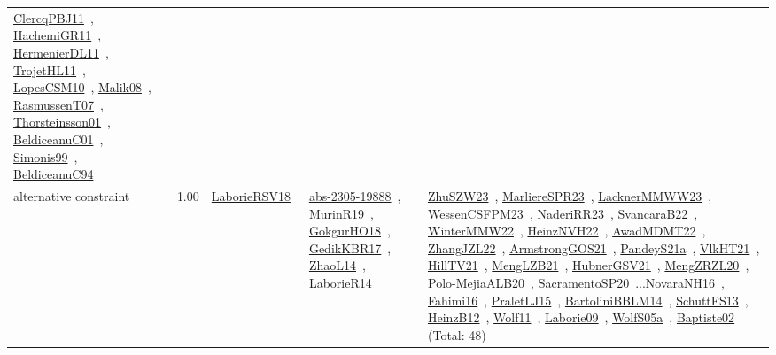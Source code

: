 {\begin{longtable}{p{3cm}r>{\raggedright\arraybackslash}p{6cm}>{\raggedright\arraybackslash}p{6cm}>{\raggedright\arraybackslash}p{8cm}}
\href{../works/ClercqPBJ11.pdf}{ClercqPBJ11}~\cite{ClercqPBJ11}, \href{../works/HachemiGR11.pdf}{HachemiGR11}~\cite{HachemiGR11}, \href{../works/HermenierDL11.pdf}{HermenierDL11}~\cite{HermenierDL11}, \href{../works/TrojetHL11.pdf}{TrojetHL11}~\cite{TrojetHL11}, \href{../works/LopesCSM10.pdf}{LopesCSM10}~\cite{LopesCSM10}, \href{../works/Malik08.pdf}{Malik08}~\cite{Malik08}, \href{../works/RasmussenT07.pdf}{RasmussenT07}~\cite{RasmussenT07}, \href{../works/Thorsteinsson01.pdf}{Thorsteinsson01}~\cite{Thorsteinsson01}, \href{../works/BeldiceanuC01.pdf}{BeldiceanuC01}~\cite{BeldiceanuC01}, \href{../works/Simonis99.pdf}{Simonis99}~\cite{Simonis99}, \href{../works/BeldiceanuC94.pdf}{BeldiceanuC94}~\cite{BeldiceanuC94}\\
\index{alternative constraint}\index{Constraints!alternative constraint}alternative constraint &  1.00 & \href{../works/LaborieRSV18.pdf}{LaborieRSV18}~\cite{LaborieRSV18} & \href{../works/abs-2305-19888.pdf}{abs-2305-19888}~\cite{abs-2305-19888}, \href{../works/MurinR19.pdf}{MurinR19}~\cite{MurinR19}, \href{../works/GokgurHO18.pdf}{GokgurHO18}~\cite{GokgurHO18}, \href{../works/GedikKBR17.pdf}{GedikKBR17}~\cite{GedikKBR17}, \href{../works/ZhaoL14.pdf}{ZhaoL14}~\cite{ZhaoL14}, \href{../works/LaborieR14.pdf}{LaborieR14}~\cite{LaborieR14} & \href{../works/ZhuSZW23.pdf}{ZhuSZW23}~\cite{ZhuSZW23}, \href{../works/MarliereSPR23.pdf}{MarliereSPR23}~\cite{MarliereSPR23}, \href{../works/LacknerMMWW23.pdf}{LacknerMMWW23}~\cite{LacknerMMWW23}, \href{../works/WessenCSFPM23.pdf}{WessenCSFPM23}~\cite{WessenCSFPM23}, \href{../works/NaderiRR23.pdf}{NaderiRR23}~\cite{NaderiRR23}, \href{../works/SvancaraB22.pdf}{SvancaraB22}~\cite{SvancaraB22}, \href{../works/WinterMMW22.pdf}{WinterMMW22}~\cite{WinterMMW22}, \href{../works/HeinzNVH22.pdf}{HeinzNVH22}~\cite{HeinzNVH22}, \href{../works/AwadMDMT22.pdf}{AwadMDMT22}~\cite{AwadMDMT22}, \href{../works/ZhangJZL22.pdf}{ZhangJZL22}~\cite{ZhangJZL22}, \href{../works/ArmstrongGOS21.pdf}{ArmstrongGOS21}~\cite{ArmstrongGOS21}, \href{../works/PandeyS21a.pdf}{PandeyS21a}~\cite{PandeyS21a}, \href{../works/VlkHT21.pdf}{VlkHT21}~\cite{VlkHT21}, \href{../works/HillTV21.pdf}{HillTV21}~\cite{HillTV21}, \href{../works/MengLZB21.pdf}{MengLZB21}~\cite{MengLZB21}, \href{../works/HubnerGSV21.pdf}{HubnerGSV21}~\cite{HubnerGSV21}, \href{../works/MengZRZL20.pdf}{MengZRZL20}~\cite{MengZRZL20}, \href{../works/Polo-MejiaALB20.pdf}{Polo-MejiaALB20}~\cite{Polo-MejiaALB20}, \href{../works/SacramentoSP20.pdf}{SacramentoSP20}~\cite{SacramentoSP20}...\href{../works/NovaraNH16.pdf}{NovaraNH16}~\cite{NovaraNH16}, \href{../works/Fahimi16.pdf}{Fahimi16}~\cite{Fahimi16}, \href{../works/PraletLJ15.pdf}{PraletLJ15}~\cite{PraletLJ15}, \href{../works/BartoliniBBLM14.pdf}{BartoliniBBLM14}~\cite{BartoliniBBLM14}, \href{../works/SchuttFS13.pdf}{SchuttFS13}~\cite{SchuttFS13}, \href{../works/HeinzB12.pdf}{HeinzB12}~\cite{HeinzB12}, \href{../works/Wolf11.pdf}{Wolf11}~\cite{Wolf11}, \href{../works/Laborie09.pdf}{Laborie09}~\cite{Laborie09}, \href{../works/WolfS05a.pdf}{WolfS05a}~\cite{WolfS05a}, \href{../works/Baptiste02.pdf}{Baptiste02}~\cite{Baptiste02} (Total: 48)\\

\end{longtable}}
